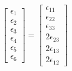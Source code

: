 \documentclass[12pt,a4paper]{article}
\begin{document}
\begin{equation}
\begin{bmatrix} \epsilon_1 \\ \epsilon_2 \\ \epsilon_3 \\ \epsilon_4 \\ \epsilon_5 \\ \epsilon_6 \end{bmatrix} =
\begin{bmatrix} \epsilon_{11} \\ \epsilon_{22} \\ \epsilon_{33} \\ 2\epsilon_{23} \\ 2\epsilon_{13} \\ 2\epsilon_{12} \end{bmatrix} 
\end{equation}
\end{document}
